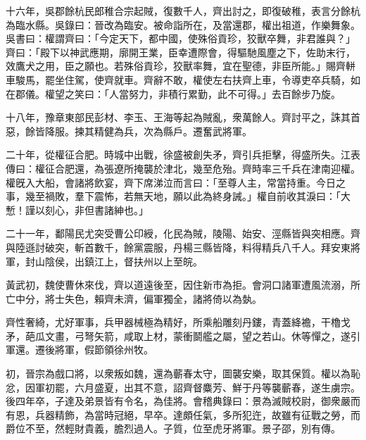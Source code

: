 \begin{pinyinscope}
十六年，吳郡餘杭民郎稚合宗起賊，復數千人，齊出討之，即復破稚，表言分餘杭為臨水縣。吳錄曰：晉改為臨安。被命詣所在，及當還郡，權出祖道，作樂舞象。吳書曰：權謂齊曰：「今定天下，都中國，使殊俗貢珍，狡獸卒舞，非君誰與？」齊曰：「殿下以神武應期，廓開王業，臣幸遭際會，得驅馳風塵之下，佐助末行，效鷹犬之用，臣之願也。若殊俗貢珍，狡獸率舞，宜在聖德，非臣所能。」賜齊軿車駿馬，罷坐住駕，使齊就車。齊辭不敢，權使左右扶齊上車，令導吏卒兵騎，如在郡儀。權望之笑曰：「人當努力，非積行累勤，此不可得。」去百餘步乃旋。

十八年，豫章東部民彭材、李玉、王海等起為賊亂，衆萬餘人。齊討平之，誅其首惡，餘皆降服。揀其精健為兵，次為縣戶。遷奮武將軍。

二十年，從權征合肥。時城中出戰，徐盛被創失矛，齊引兵拒擊，得盛所失。江表傳曰：權征合肥還，為張遼所掩襲於津北，幾至危殆。齊時率三千兵在津南迎權。權旣入大船，會諸將飲宴，齊下席涕泣而言曰：「至尊人主，常當持重。今日之事，幾至禍敗，羣下震怖，若無天地，願以此為終身誡。」權自前收其淚曰：「大慙！謹以刻心，非但書諸紳也。」

二十一年，鄱陽民尤突受曹公印綬，化民為賊，陵陽、始安、涇縣皆與突相應。齊與陸遜討破突，斬首數千，餘黨震服，丹楊三縣皆降，料得精兵八千人。拜安東將軍，封山陰侯，出鎮江上，督扶州以上至皖。

黃武初，魏使曹休來伐，齊以道遠後至，因住新市為拒。會洞口諸軍遭風流溺，所亡中分，將士失色，賴齊未濟，偏軍獨全，諸將倚以為埶。

齊性奢綺，尤好軍事，兵甲器械極為精好，所乘船雕刻丹鏤，青蓋絳襜，干櫓戈矛，葩瓜文畫，弓弩矢箭，咸取上材，蒙衝鬬艦之屬，望之若山。休等憚之，遂引軍還。遷後將軍，假節領徐州牧。

初，晉宗為戲口將，以衆叛如魏，還為蘄春太守，圖襲安樂，取其保質。權以為恥忿，因軍初罷，六月盛夏，出其不意，詔齊督麋芳、鮮于丹等襲蘄春，遂生虜宗。後四年卒，子達及弟景皆有令名，為佳將。會稽典錄曰：景為滅賊校尉，御衆嚴而有恩，兵器精飾，為當時冠絕，早卒。達頗任氣，多所犯迕，故雖有征戰之勞，而爵位不至，然輕財貴義，膽烈過人。子質，位至虎牙將軍。景子邵，別有傳。


\end{pinyinscope}